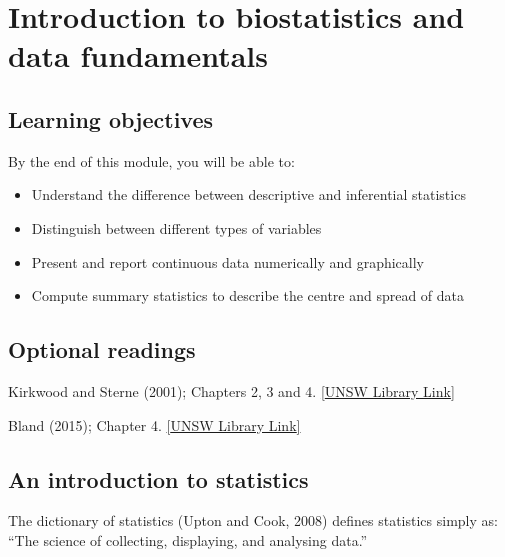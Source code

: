 \documentclass[
  a4paper,
]{memoir}
\providecommand{\tightlist}{%
  \setlength{\itemsep}{0pt}\setlength{\parskip}{0pt}}
\begin{document}
\chapter{Introduction to biostatistics and data
fundamentals}\label{introduction-to-biostatistics-and-data-fundamentals}

\section*{Learning objectives}\label{learning-objectives}


By the end of this module, you will be able to:

\begin{itemize}
\tightlist
\item
  Understand the difference between descriptive and inferential
  statistics
\item
  Distinguish between different types of variables
\item
  Present and report continuous data numerically and graphically
\item
  Compute summary statistics to describe the centre and spread of data
\end{itemize}

\section*{Optional readings}\label{optional-readings}


Kirkwood and Sterne (2001); Chapters 2, 3 and 4.
\href{http://er1.library.unsw.edu.au/er/cgi-bin/eraccess.cgi?url=https://ebookcentral.proquest.com/lib/unsw/detail.action?docID=624728}{{[}UNSW
Library Link{]}}

Bland (2015); Chapter 4.
\href{http://er1.library.unsw.edu.au/er/cgi-bin/eraccess.cgi?url=https://ebookcentral.proquest.com/lib/unsw/detail.action?docID=5891730}{{[}UNSW
Library Link{]}}

\section{An introduction to
statistics}\label{an-introduction-to-statistics}

The dictionary of statistics (Upton and Cook, 2008) defines statistics
simply as: ``The science of collecting, displaying, and analysing
data.''
\end{document}
